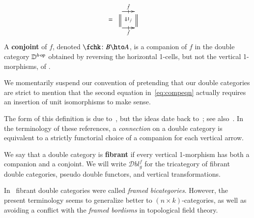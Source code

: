 \documentclass{amsart}
\begin{document}
\begin{defn}
\begin{align}
\begin{array}{c}
    \end{array} &=
    \begin{array}{c}
      \xymatrix@-.5pc{
        \ar[r]|-@{|}^-{\fhat} \ar@{=}[d] \ar@{}[dr]|{\Downarrow 1_{\fhat}}
        & \ar@{=}[d]\\
        \ar[r]|-@{|}_-{\fhat} & }
    \end{array}
  \end{align}
  A \textbf{conjoint} of $f$, denoted $\fchk\maps B\hto A$, is a
  companion of $f$ in the double category $\mathbb{D}^{h\cdot\mathrm{op}}$
  obtained by reversing the horizontal 1-cells, but not the vertical
  1-morphisms, of \lD.
\end{defn}

\begin{rmk}
  We momentarily suspend our convention of pretending that our double
  categories are strict to mention that the second
  equation in~\eqref{eq:compeqn} actually requires an insertion of unit
  isomorphisms to make sense.
\end{rmk}

The form of this definition is due
to~\cite{gp:double-adjoints,dpp:spans}, but the ideas date back
to~\cite{bs:dblgpd-xedmod}; see
also~\cite{bm:dbl-thin-conn,fiore:pscat}.  In the terminology of these
references, a \emph{connection} on a double category is equivalent to
a strictly functorial choice of a companion for each vertical arrow.

\begin{defn}
  We say that a double category is \textbf{fibrant} if every vertical
  1-morphism has both a companion and a conjoint. We will write $\mathcal{D}bl^f_g$ for the tricategory of fibrant double categories, pseudo double functors, and vertical transformations.
\end{defn}



\begin{rmk}
  In~\cite{shulman:frbi} fibrant double categories were called
  \emph{framed bicategories}.  However, the present terminology seems
  to generalize better to $(n\times k)$-categories, as well as
  avoiding a conflict with the \emph{framed bordisms} in topological
  field theory.
\end{rmk}
\end{document}

